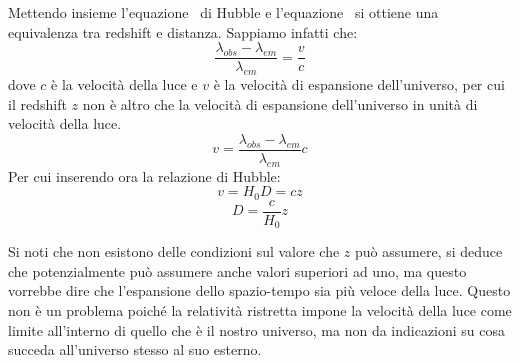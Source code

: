 Mettendo insieme l'equazione~ di Hubble e l'equazione~ si ottiene una equivalenza tra redshift e distanza. Sappiamo infatti che:
\[
    \frac{\lambda_{obs} - \lambda_{em}}{\lambda_{em}} = \frac{v}{c}
\]
dove $c$ è la velocità della luce e $v$ è la velocità di espansione dell'universo, per cui il redshift $z$ non è altro che la velocità di espansione dell'universo in unità di velocità della luce.
\[
    v = \frac{\lambda_{obs} - \lambda_{em}}{\lambda_{em}} c
\]
Per cui inserendo ora la relazione di Hubble:
\[
    v = H_0 D = c z
\]
\begin{equation}\label{eq:ditanza-redshift}
    D = \frac{c}{H_0}z
\end{equation}

Si noti che non esistono delle condizioni sul valore che $z$ può assumere, si deduce che potenzialmente può assumere anche valori superiori ad uno, ma questo vorrebbe dire che l'espansione dello spazio-tempo sia più veloce della luce. Questo non è un problema poiché la relatività ristretta impone la velocità della luce come limite all'interno di quello che è il nostro universo, ma non da indicazioni su cosa succeda all'universo stesso al suo esterno.